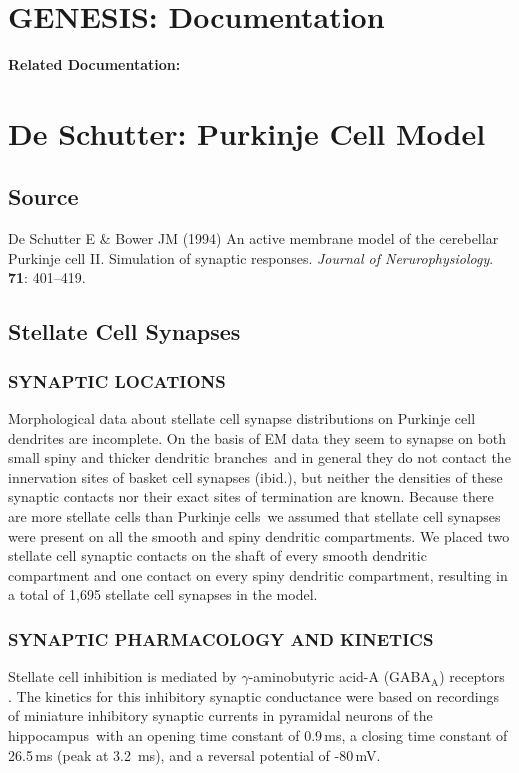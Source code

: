 \documentclass[12pt]{article}
\begin{document}
\section*{GENESIS: Documentation}

{\bf Related Documentation:}

\section*{De Schutter: Purkinje Cell Model}

\subsection*{Source}

De Schutter E \& Bower JM (1994) An active membrane model of the cerebellar Purkinje cell II. Simulation of synaptic responses. {\it Journal of Nerurophysiology}. {\bf 71}: 401--419.

\subsection*{Stellate Cell Synapses}

\subsubsection*{SYNAPTIC LOCATIONS}

Morphological data about stellate cell
synapse distributions on Purkinje cell dendrites are incomplete.
On the basis of EM data they seem to synapse on both small spiny
and thicker dendritic branches\,\cite{Palay:1974fk} and
in general they do not contact the innervation sites of basket cell
synapses (ibid.), but neither the densities of these synaptic contacts
nor their exact sites of termination are known. Because there
are more stellate cells than Purkinje cells\,\cite{Ito:1984uq} we assumed
that stellate cell synapses were present on all the smooth and spiny
dendritic compartments. We placed two stellate cell synaptic contacts
on the shaft of every smooth dendritic compartment and one
contact on every spiny dendritic compartment, resulting in a total
of 1,695 stellate cell synapses in the model.

\subsubsection*{SYNAPTIC PHARMACOLOGY AND KINETICS}
Stellate cell inhibition
is mediated by $\gamma$-aminobutyric acid-A (GABA$_{\mbox{A}}$) receptors\,
\cite{Gabbot:1986fk, Ito:1984uq, Llano:1991uq}. The kinetics for
this inhibitory synaptic conductance were based on recordings of
miniature inhibitory synaptic currents in pyramidal neurons of
the hippocampus\,\cite{Ropert:1990kx} with an opening time constant
of 0.9\,ms, a closing time constant of 26.5\,ms (peak at 3.2\,
ms), and a reversal potential of -80\,mV.
\end{document}
